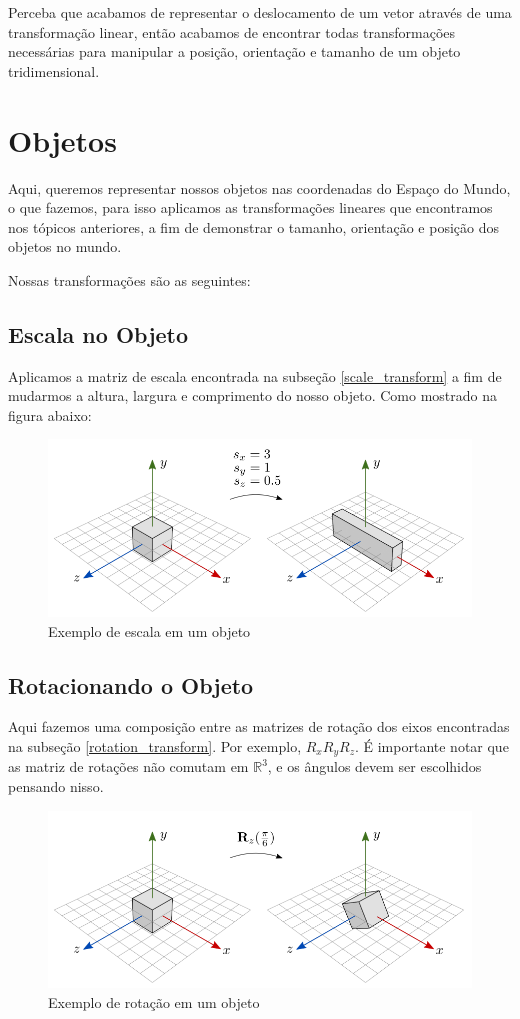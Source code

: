 \documentclass[12pt]{article}
\begin{document}
Perceba que acabamos de representar o deslocamento de um vetor através de uma transformação linear, então acabamos de encontrar todas transformações necessárias para manipular a posição, orientação  e tamanho de um objeto tridimensional.


\section{Objetos}

Aqui, queremos representar nossos objetos nas coordenadas do Espaço do Mundo, o que fazemos, para isso aplicamos as transformações lineares que encontramos nos tópicos anteriores, a fim de demonstrar o tamanho, orientação e posição dos objetos no mundo.

Nossas transformações são as seguintes:

\subsection{Escala no Objeto}

Aplicamos a matriz de escala encontrada na subseção {\ref{scale_transform}} a fim de mudarmos a altura, largura e comprimento do nosso objeto. Como mostrado na figura abaixo:

\begin{figure}[H]
    \centering
    \includegraphics[width=0.6\linewidth]{imgs/07_scaling4.png}
    \caption{Exemplo de escala em um objeto}
\end{figure}

\subsection{Rotacionando o Objeto}

Aqui fazemos uma composição entre as matrizes de rotação dos eixos encontradas na subseção {\ref{rotation_transform}}. Por exemplo, $R_x R_y R_z$. É importante notar que as matriz de rotações não comutam em $\mathbb{R}^3$, e os ângulos devem ser escolhidos pensando nisso.

\begin{figure}[H]
    \centering
    \includegraphics[width=0.6\linewidth]{imgs/07_rotation5.png}
    \caption{Exemplo de rotação em um objeto}
\end{figure}
\end{document}
